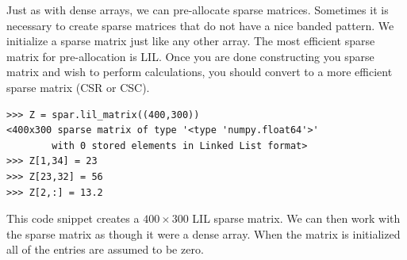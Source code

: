 Just as with dense arrays, we can pre-allocate sparse matrices.
Sometimes it is necessary to create sparse matrices that do not have a nice banded pattern.
We initialize a sparse matrix just like any other array.
The most efficient sparse matrix for pre-allocation is LIL.
Once you are done constructing you sparse matrix and wish to perform calculations,
you should convert to a more efficient sparse matrix (CSR or CSC).
\begin{lstlisting}
>>> Z = spar.lil_matrix((400,300))
<400x300 sparse matrix of type '<type 'numpy.float64'>'
        with 0 stored elements in Linked List format>
>>> Z[1,34] = 23
>>> Z[23,32] = 56
>>> Z[2,:] = 13.2
\end{lstlisting}
This code snippet creates a $400 \times 300$ LIL sparse matrix.
We can then work with the sparse matrix as though it were a dense array.
When the matrix is initialized all of the entries are assumed to be zero. 